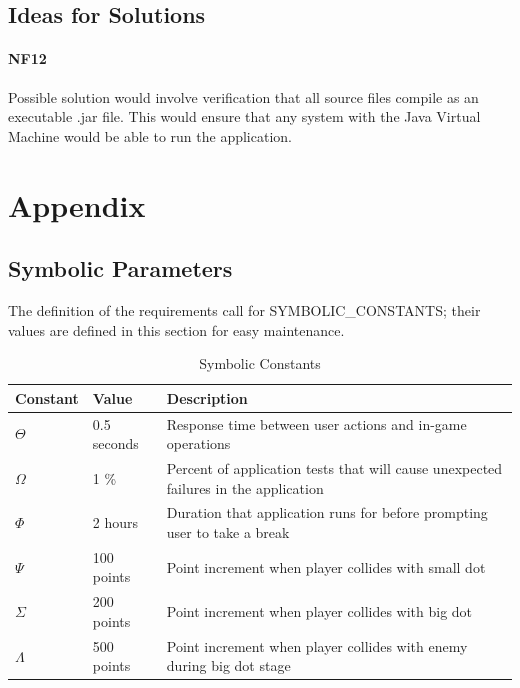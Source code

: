 \documentclass[12pt, titlepage]{article}
\begin{document}
\subsection{Ideas for Solutions}
\paragraph{NF12}
Possible solution would involve verification that all source files compile as an executable .jar file. This would ensure that any system with the Java Virtual Machine would be able to run the application.

\newpage





\newpage

\section{Appendix}

\subsection{Symbolic Parameters}

The definition of the requirements call for SYMBOLIC\_CONSTANTS; their values are defined in this section for easy maintenance.

\begin{table}[H]
\caption{Symbolic Constants} \label{tab:constants}
\begin{tabularx}{\textwidth}{p{3cm}p{2cm}X}
\toprule {\bf Constant} & {\bf Value} & {\bf Description}\\
\midrule
$\Theta$ & 0.5 seconds & Response time between user actions and in-game operations\\
$\Omega$ & 1 \% & Percent of application tests that will cause unexpected failures in the application\\
$\Phi$ & 2 hours & Duration that application runs for before prompting user to take a break\\
$\Psi$ & 100 points & Point increment when player collides with small dot\\
$\Sigma$ & 200 points & Point increment when player collides with big dot\\
$\Lambda$ & 500 points & Point increment when player collides with enemy during big dot stage\\
\bottomrule
\end{tabularx}
\end{table}
\end{document}
